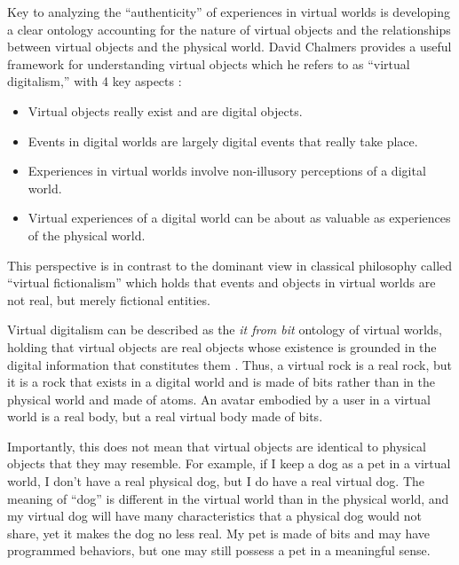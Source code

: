 Key to analyzing the ``authenticity'' of experiences in virtual worlds is
developing a clear ontology accounting for the nature of virtual objects and the
relationships between virtual objects and the physical world. David Chalmers
provides a useful framework for understanding virtual objects which he refers 
to as ``virtual digitalism,'' with 4 key aspects \citep{Chalmers2017-CHATVA-3}:
\begin{itemize}
    \item Virtual objects really exist and are digital objects.
    \item Events in digital worlds are largely digital events that really take
          place.
    \item Experiences in virtual worlds involve non-illusory perceptions of a
          digital world.
    \item Virtual experiences of a digital world can be about as valuable as
          experiences of the physical world.
\end{itemize}
This perspective is in contrast to the dominant view in classical philosophy
called ``virtual fictionalism'' which holds that events and objects in virtual
worlds are not real, but merely fictional entities. 

Virtual digitalism can be described as the \emph{it from bit} ontology of
virtual worlds, holding that virtual objects are real objects whose existence is
grounded in the digital information that constitutes them
\citep{Chalmers2022-CHARVW}. Thus, a virtual rock is a real rock, but it is a rock
that exists in a digital world and is made of bits rather than in the physical
world and made of atoms. An avatar embodied by a user in a virtual world is a
real body, but a real virtual body made of bits.

Importantly, this does not mean that virtual objects are identical to physical
objects that they may resemble. For example, if I keep a dog as a pet in a 
virtual world, I don't have a real physical dog, but I do have a real virtual
dog. The meaning of ``dog'' is different in the virtual world than in the
physical world, and my virtual dog will have many characteristics that a
physical dog would not share, yet it makes the dog no less real. My pet is made
of bits and may have programmed behaviors, but one may still possess a pet in a
meaningful sense.

